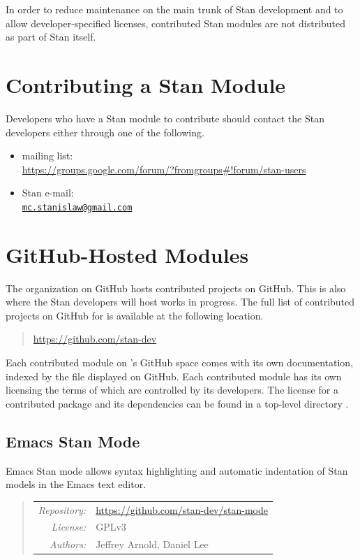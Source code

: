 In order to reduce maintenance on the main trunk of Stan development
and to allow developer-specified licenses, contributed Stan modules
are not distributed as part of Stan itself.


\section{Contributing a Stan Module}

Developers who have a Stan module to contribute should contact the
Stan developers either through one of the following.
%
\begin{itemize}
\item {} mailing list: 
\\
\url{https://groups.google.com/forum/?fromgroups#!forum/stan-users}
\item Stan e-mail: 
\\
\href{mailto:mc.stanislaw@gmail.com}{\tt mc.stanislaw@gmail.com}
\end{itemize}


\section{GitHub-Hosted Modules}

The  organization on GitHub hosts contributed projects
on GitHub.  This is also where the Stan developers will host works in
progress.  The full list of contributed projects on GitHub for
 is available at the following location.
%
\begin{quote}
\url{https://github.com/stan-dev}
\end{quote}

Each contributed module on 's GitHub space comes with
its own documentation, indexed by the  file displayed
on GitHub.  Each contributed module has its own licensing the terms of
which are controlled by its developers.  The license for a contributed
package and its dependencies can be found in a top-level directory
.

\subsection{Emacs Stan Mode}

\noindent
Emacs Stan mode allows syntax highlighting and automatic indentation
of Stan models in the Emacs text editor.

\begin{quote}
\begin{tabular}{rl}
{\it Repository:} & \url{https://github.com/stan-dev/stan-mode}
\\[4pt]
{\it License:} & GPLv3
\\[4pt]
{\it Authors:} & Jeffrey Arnold, Daniel Lee
\end{tabular}
\end{quote}

